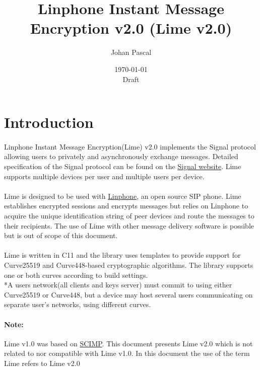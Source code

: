 \documentclass[a4paper,11pt]{article}
\title{Linphone Instant Message Encryption v2.0 (Lime v2.0)}
\date{\today\\Draft}
\author{Johan Pascal}
\begin{document}
\maketitle
\tableofcontents
\newpage

\section{Introduction}
\paragraph{}Linphone Instant Message Encryption(Lime) v2.0 implements the Signal protocol allowing users to privately and asynchronously exchange messages. Detailed specification of the Signal protocol can be found on the \href{https://signal.org/docs/}{Signal website}. Lime supports multiple devices per user and multiple users per device.
\paragraph{}Lime is designed to be used with \href{https://linphone.org}{Linphone}, an open source SIP phone. Lime establishes encrypted sessions and encrypts messages but relies on Linphone to acquire the unique identification string of peer devices and route the messages to their recipients. The use of Lime with other message delivery software is possible but is out of scope of this document.
\paragraph*{}Lime is written in C\nolinebreak\hspace{-.05em}\raisebox{.4ex}{\tiny\bf +}\nolinebreak\hspace{-.10em}\raisebox{.4ex}{\tiny\bf +}11 and the library uses templates to provide support for Curve25519 and Curve448-based cryptographic algorithms. The library supports one or both curves according to build settings.\\*A users network(all clients and keys server) must commit to using either Curve25519 or Curve448, but a device may host several users communicating on separate user's networks, using different curves.
\paragraph{Note:} Lime v1.0 was based on \href{https://en.wikipedia.org/wiki/Silent_Circle_Instant_Messaging_Protocol}{SCIMP}. This document presents Lime v2.0 which is not related to nor compatible with Lime v1.0. In this document the use of the term Lime refers to Lime v2.0
\end{document}
